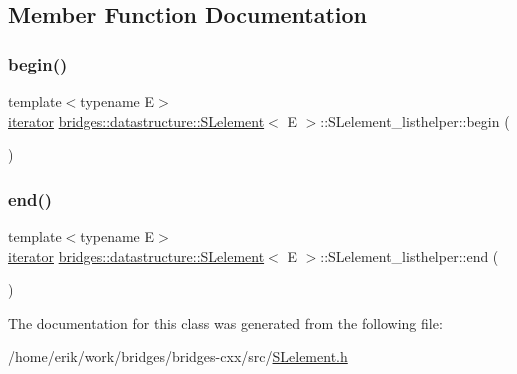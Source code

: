 \subsection{Member Function Documentation}
\mbox{\label{classbridges_1_1datastructure_1_1_s_lelement_1_1_s_lelement__listhelper_a9bc74da8d0ae6cfc9506ea9480c33a15}} 
\subsubsection{\texorpdfstring{begin()}{begin()}}
{\footnotesize\ttfamily template$<$typename E$>$ \\
\hyperlink{classbridges_1_1datastructure_1_1_s_lelement_1_1_s_lelement__listhelper_1_1iterator}{iterator} \hyperlink{classbridges_1_1datastructure_1_1_s_lelement}{bridges\+::datastructure\+::\+S\+Lelement}$<$ E $>$\+::S\+Lelement\+\_\+listhelper\+::begin (\begin{DoxyParamCaption}{ }\end{DoxyParamCaption})\hspace{0.3cm}{\ttfamily [inline]}}

\mbox{\label{classbridges_1_1datastructure_1_1_s_lelement_1_1_s_lelement__listhelper_aecbbc35682d82fa86a746b9a588525d0}} 
\subsubsection{\texorpdfstring{end()}{end()}}
{\footnotesize\ttfamily template$<$typename E$>$ \\
\hyperlink{classbridges_1_1datastructure_1_1_s_lelement_1_1_s_lelement__listhelper_1_1iterator}{iterator} \hyperlink{classbridges_1_1datastructure_1_1_s_lelement}{bridges\+::datastructure\+::\+S\+Lelement}$<$ E $>$\+::S\+Lelement\+\_\+listhelper\+::end (\begin{DoxyParamCaption}{ }\end{DoxyParamCaption})\hspace{0.3cm}{\ttfamily [inline]}}



The documentation for this class was generated from the following file\+:\begin{DoxyCompactItemize}
\item 
/home/erik/work/bridges/bridges-\/cxx/src/\hyperlink{_s_lelement_8h}{S\+Lelement.\+h}\end{DoxyCompactItemize}

